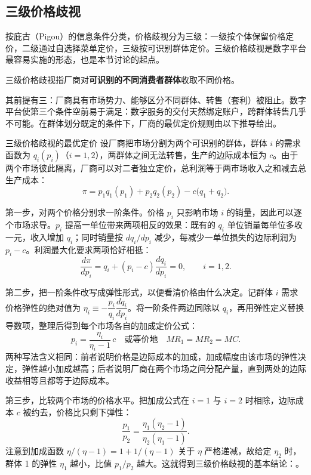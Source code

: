 \subsection{三级价格歧视}

按庇古（Pigou）的信息条件分类，价格歧视分为三级：一级按个体保留价格定价，二级通过自选择菜单定价，三级按可识别群体定价。三级价格歧视是数字平台最容易实施的形态，也是本节讨论的起点。

\begin{definition}
三级价格歧视指厂商对\textbf{可识别的不同消费者群体}收取不同价格。
\end{definition}

其前提有三：厂商具有市场势力、能够区分不同群体、转售（套利）被阻止。数字平台使第三个条件空前易于满足：数字服务的交付天然绑定账户，跨群体转售几乎不可能。在群体划分既定的条件下，厂商的最优定价规则由以下推导给出。

\begin{derivation}{三级价格歧视的最优定价}{}
设厂商把市场分割为两个可识别的群体，群体 $i$ 的需求函数为 $q_i(p_i)$（$i = 1,2$），两群体之间无法转售，生产的边际成本恒为 $c$。由于两个市场彼此隔离，厂商可以对二者独立定价，总利润等于两市场收入之和减去总生产成本：
\[
\pi = p_1 q_1(p_1) + p_2 q_2(p_2) - c\bigl(q_1 + q_2\bigr).
\]

第一步，对两个价格分别求一阶条件。价格 $p_i$ 只影响市场 $i$ 的销量，因此可以逐个市场求导。$p_i$ 提高一单位带来两项相反的效果：既有的 $q_i$ 单位销量每单位多收一元，收入增加 $q_i$；同时销量按 $dq_i/dp_i$ 减少，每减少一单位损失的边际利润为 $p_i - c$。利润最大化要求两项恰好相抵：
\[
\frac{d\pi}{dp_i} = q_i + (p_i - c)\frac{dq_i}{dp_i} = 0, \qquad i = 1,2.
\]

第二步，把一阶条件改写成弹性形式，以便看清价格由什么决定。记群体 $i$ 需求价格弹性的绝对值为 $\eta_i \equiv -\dfrac{p_i}{q_i}\dfrac{dq_i}{dp_i}$。将一阶条件两边同除以 $q_i$，再用弹性定义替换导数项，整理后得到每个市场各自的加成定价公式：
\[
p_i = \frac{\eta_i}{\eta_i - 1}\, c \quad \text{或等价地} \quad MR_1 = MR_2 = MC.
\]
两种写法含义相同：前者说明价格是边际成本的加成，加成幅度由该市场的弹性决定，弹性越小加成越高；后者说明厂商在两个市场之间分配产量，直到两处的边际收益相等且都等于边际成本。

第三步，比较两个市场的价格水平。把加成公式在 $i=1$ 与 $i=2$ 时相除，边际成本 $c$ 被约去，价格比只剩下弹性：
\[
\frac{p_1}{p_2} = \frac{\eta_1(\eta_2 - 1)}{\eta_2(\eta_1 - 1)}.
\]
注意到加成函数 $\eta/(\eta-1) = 1 + 1/(\eta-1)$ 关于 $\eta$ 严格递减，故给定 $\eta_2$ 时，群体 1 的弹性 $\eta_1$ 越小，比值 $p_1/p_2$ 越大。这就得到三级价格歧视的基本结论：。
\end{derivation}

